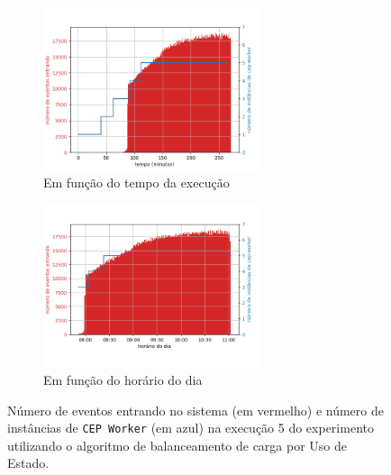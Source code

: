 \begin{figure}[h]
\centering
\begin{subfigure}{\textwidth}
\centering
\includegraphics[width=0.7\textwidth]{figuras/graphics/carga_e_workers_total10-dez-su.png}
\caption{Em função do tempo da execução}
\label{fig:workers_and_load_total_10-dez-su}
\end{subfigure}%

\begin{subfigure}{\textwidth}
\centering
\includegraphics[width=0.7\textwidth]{figuras/graphics/carga_e_workers_horario10-dez-su.png}
\caption{Em função do horário do dia}
\label{fig:workers_and_load_SPtrans_10-dez-su}
\end{subfigure}%
\caption{Número de eventos entrando no sistema (em vermelho) e número de instâncias de \texttt{CEP Worker} (em azul) na execução 5 do experimento utilizando o algoritmo de balanceamento de carga por Uso de Estado.}
\end{figure}





